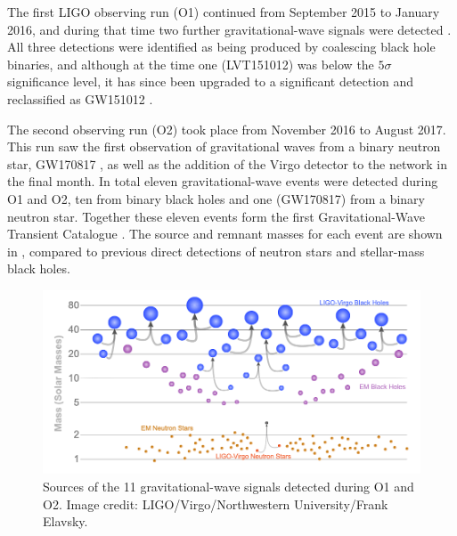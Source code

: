 \begin{colsection}
The first LIGO observing run (O1)  continued from September 2015 to January 2016, and during that time two further gravitational-wave signals were detected \citep{LIGO_O1}. All three detections were identified as being produced by coalescing black hole binaries, and although at the time one (LVT151012) was below the $5\sigma$ significance level, it has since been upgraded to a significant detection and reclassified as GW151012 \citep{GW_catalog}.

The second observing run (O2)  took place from November 2016 to August 2017. This run saw the first observation of gravitational waves from a binary neutron star, GW170817 \citep{GW170817}, as well as the addition of the Virgo detector to the network in the final month. In total eleven gravitational-wave events were detected during O1 and O2, ten from binary black holes and one (GW170817) from a binary neutron star. Together these eleven events form the first Gravitational-Wave Transient Catalogue  \citep[GWTC-1;][]{GW_catalog}. The source and remnant masses for each event are shown in , compared to previous direct detections of neutron stars and stellar-mass black holes.

\begin{figure}[t]
    \begin{center}
        \includegraphics[width=\linewidth]{images/gw_masses2.png}
    \end{center}
    \caption[Sources of gravitational waves detected during O1 and O2]{
        Sources of the 11 gravitational-wave signals detected during O1 and O2.
        Image credit: LIGO/Virgo/Northwestern University/Frank Elavsky.
        }\label{fig:gw_masses}
\end{figure}


\end{colsection}
